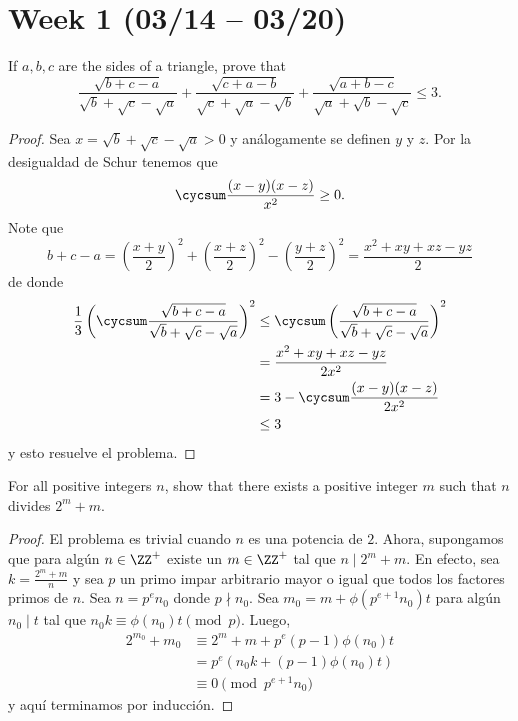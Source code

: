 \section{Week 1 (03/14 -- 03/20)}

\begin{probEG}
	If $a,b,c$ are the sides of a triangle, prove that
	\[\frac{\sqrt{b+c-a}}{\sqrt b+\sqrt c-\sqrt a}+\frac{\sqrt{c+a-b}}{\sqrt c+\sqrt a-\sqrt b}+\frac{\sqrt{a+b-c}}{\sqrt a+\sqrt b-\sqrt c}\le 3.\]
\end{probEG}

\begin{proof}
	Sea $x=\sqrt b+\sqrt c-\sqrt a>0$ y análogamente se definen $y$ y $z$. Por la desigualdad de Schur tenemos que
	\[\cycsum\frac{(x-y)(x-z)}{x^2}\ge 0.\]
	Note que
	\[b+c-a=\left(\frac{x+y}{2}\right)^2+\left(\frac{x+z}{2}\right)^2-\left(\frac{y+z}{2}\right)^2=\frac{x^2+xy+xz-yz}{2}\]
	de donde
	\begin{align*}
		\frac13\left(\cycsum\frac{\sqrt{b+c-a}}{\sqrt b+\sqrt c-\sqrt a}\right)^2
		&\le\cycsum\left(\frac{\sqrt{b+c-a}}{\sqrt b+\sqrt c-\sqrt a}\right)^2 \\
		&=\frac{x^2+xy+xz-yz}{2x^2} \\
		&=3-\cycsum\frac{(x-y)(x-z)}{2x^2} \\
		&\le 3
	\end{align*}
	y esto resuelve el problema.
\end{proof}

\begin{probEB}
	For all positive integers $n$, show that there exists a positive integer $m$ such that $n$ divides $2^m+m$.
\end{probEB}

\begin{proof}
	El problema es trivial cuando $n$ es una potencia de $2$. Ahora, supongamos que para algún $n\in\ZZ^+$ existe un $m\in\ZZ^+$ tal que $n\mid 2^m+m$. En efecto, sea $k=\frac{2^m+m}{n}$ y sea $p$ un primo impar arbitrario mayor o igual que todos los factores primos de $n$. Sea $n=p^en_0$ donde $p\nmid n_0$. Sea $m_0=m+\phi(p^{e+1}n_0)t$ para algún $n_0\mid t$ tal que $n_0k\equiv\phi(n_0)t\pmod p$. Luego,
	\begin{align*}
		2^{m_0}+m_0
		&\equiv 2^m+m+p^e(p-1)\phi(n_0)t \\
		&=p^e\left(n_0k+(p-1)\phi(n_0)t\right) \\
		&\equiv 0\pmod{p^{e+1}n_0}
	\end{align*}
	y aquí terminamos por inducción.
\end{proof}

